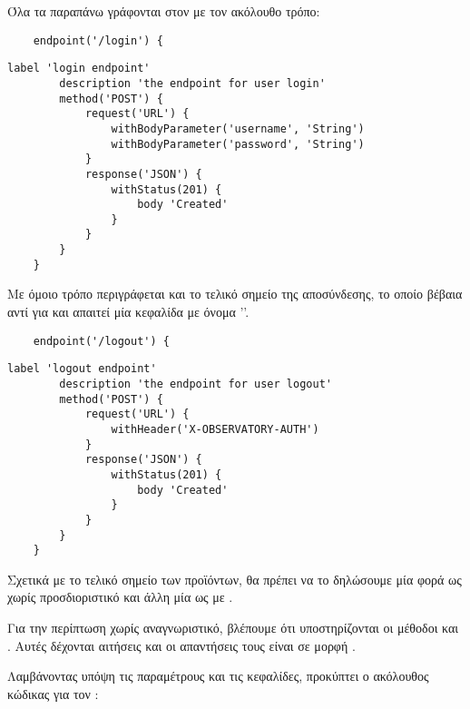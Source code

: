     Όλα τα παραπάνω γράφονται στον  με τον ακόλουθο τρόπο:

    \begin{lstlisting}
    endpoint('/login') {
    \end{lstlisting}
    \begin{lstlisting}[deletekeywords={endpoint}]
        label 'login endpoint'
        description 'the endpoint for user login'
        method('POST') {
            request('URL') {
                withBodyParameter('username', 'String')
                withBodyParameter('password', 'String')
            }
            response('JSON') {
                withStatus(201) {
                    body 'Created'
                }
            }
        }
    }
    \end{lstlisting}

    Με όμοιο τρόπο περιγράφεται και το τελικό σημείο της αποσύνδεσης,
    το οποίο βέβαια αντί για  και  απαιτεί 
    μία κεφαλίδα με όνομα ''.

    \begin{lstlisting}
    endpoint('/logout') {
    \end{lstlisting}
    \begin{lstlisting}[deletekeywords={endpoint}]
        label 'logout endpoint'
        description 'the endpoint for user logout'
        method('POST') {
            request('URL') {
                withHeader('X-OBSERVATORY-AUTH')
            }
            response('JSON') {
                withStatus(201) {
                    body 'Created'
                }
            }
        }
    }
    \end{lstlisting}

    Σχετικά με το τελικό σημείο των προϊόντων,
    θα πρέπει να το δηλώσουμε μία φορά ως  χωρίς προσδιοριστικό
    και άλλη μία ως  με .
    
    Για την περίπτωση χωρίς αναγνωριστικό,
    βλέπουμε ότι υποστηρίζονται οι μέθοδοι  και .
    Αυτές δέχονται  αιτήσεις 
    και οι απαντήσεις τους είναι σε μορφή .

    Λαμβάνοντας υπόψη τις παραμέτρους και τις κεφαλίδες,
    προκύπτει ο ακόλουθος κώδικας για τον :

